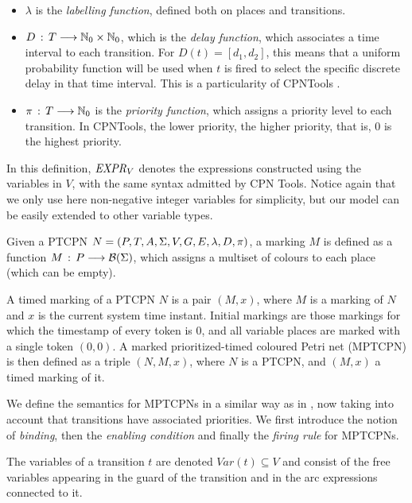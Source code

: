 \begin{definition} 
\begin{itemize}
\item $\lambda$ is the {\em labelling function}, defined
both on places and transitions.

\item $D\,:\,T \longrightarrow \mathbb{N}_{0} \times \mathbb{N}_{0}$, which
is the {\em delay function}, which associates a time
interval to each transition. For $D(t)=[d_1,d_2]$,
this means that a uniform probability function will
be used when $t$ is fired to select the specific discrete
delay in that time interval. This is a particularity of CPNTools \cite{CPNTools}.
%
\item $\pi\,:\,T \longrightarrow \mathbb{N}_{0}$ is the
{\em priority function}, which assigns a priority level
to each transition. In CPNTools, the lower priority, the higher priority, that is, $0$ is the highest priority.
\end{itemize}

In this definition, ${\it EXPR}_V$ denotes the
expressions constructed using the variables in $V$,
with the same syntax admitted by CPN Tools. Notice again that we only use here non-negative integer variables for simplicity, but
our model can be easily extended to other variable types.
\end{definition}

\begin{definition} [(Markings)]
Given a PTCPN $N=(P,T,A,\Sigma,V,G,E,\lambda,D,\pi)$,
a marking $M$ is defined as a function
$M\,:\,P \longrightarrow {\cal B}(\Sigma)$,
which assigns a multiset of colours to each place
(which can be empty). 

A timed marking of a PTCPN $N$ is a pair $(M,x)$, where
$M$ is a marking of $N$ and $x$ is the current system time instant.
%
%
Initial markings are those markings for which
the timestamp of every token is $0$,
and all variable places are marked with a single
token $(0,0)$.
A marked prioritized-timed coloured Petri net (MPTCPN)
is then defined as a triple $(N,M,x)$, where
$N$ is a PTCPN, and $(M,x)$ a timed marking of it.
%
\end{definition}

We define the semantics for MPTCPNs in a similar way as in \cite{Jensen2009}, 
now taking into account that transitions have associated priorities.
We first introduce the notion of {\em binding}, then
the {\em enabling condition} and finally the {\em firing rule}
for MPTCPNs.

The variables of a transition $t$ are denoted $\mathit{Var(t)\subseteq V}$ and consist of the free variables
appearing in the guard of the transition and in the arc expressions connected to it.


